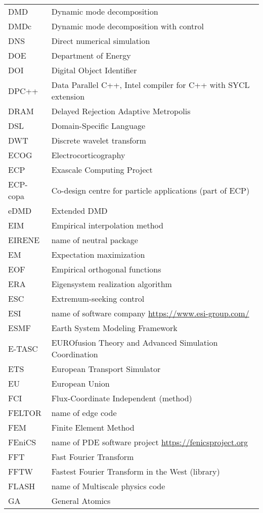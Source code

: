 \begin{longtable}{|p{4.0cm}|p{12.0cm}|}
DMD  & Dynamic mode decomposition \\
DMDc  & Dynamic mode decomposition with control \\
DNS  & Direct numerical simulation \\
DOE & Department of Energy \\
DOI & Digital Object Identifier \\
DPC++ & Data Parallel C++, Intel compiler for C++ with SYCL extension \\
DRAM & Delayed Rejection Adaptive Metropolis \\
DSL & Domain-Specific Language \\
DWT  & Discrete wavelet transform \\
ECOG  & Electrocorticography \\
ECP & Exascale Computing Project \\
ECP-copa & Co-design centre for particle applications (part of ECP)\\
eDMD  & Extended DMD \\
EIM  & Empirical interpolation method \\
EIRENE & name of neutral package  \\
EM  & Expectation maximization \\
EOF  & Empirical orthogonal functions \\
ERA  & Eigensystem realization algorithm \\
ESC  & Extremum-seeking control \\
ESI & name of software company \url{https://www.esi-group.com/}  \\
ESMF & Earth System Modeling Framework \\
E-TASC & EUROfusion Theory and Advanced Simulation Coordination \\
ETS & European Transport Simulator\\
EU & European Union \\
FCI & Flux-Coordinate Independent (method) \\
FELTOR & name of edge code \\
FEM & Finite Element Method \\
FEniCS & name of PDE software project \url{https://fenicsproject.org} \\
FFT & Fast Fourier Transform \\
FFTW & Fastest Fourier Transform in the West (library) \\
FLASH & name of Multiscale physics code \\
GA & General Atomics \\

\end{longtable}

